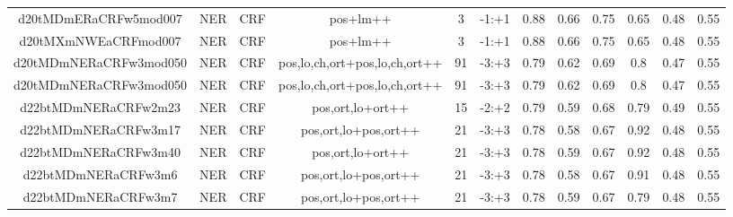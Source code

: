 \documentclass[a4paper]{article}
\begin{document}
\begin{landscape}
\begin{center}
\begin{tabular}{ |c|c|c|c|c|c|c|c|c|c|c|c|}
 
 	
 	\small{ d20tMDmERaCRFw5mod007 } & \small{ NER} & \small{  CRF }  & pos+lm++  &  3 &  \small{  -1:+1 }  &  0.88 & 0.66 & 0.75  &  0.65 & 0.48 & 0.55 \\
 	

 
 	
 	\small{ d20tMXmNWEaCRFmod007 } & \small{ NER} & \small{  CRF }  & pos+lm++  &  3 &  \small{  -1:+1 }  &  0.88 & 0.66 & 0.75  &  0.65 & 0.48 & 0.55 \\
 	

 
 	
 	\small{ d20tMDmNERaCRFw3mod050 } & \small{ NER} & \small{  CRF }  & pos,lo,ch,ort+pos,lo,ch,ort++  &  91 &  \small{  -3:+3 }  &  0.79 & 0.62 & 0.69  &  0.8 & 0.47 & 0.55 \\
 	

 
 	
 	\small{ d20tMDmNERaCRFw3mod050 } & \small{ NER} & \small{  CRF }  & pos,lo,ch,ort+pos,lo,ch,ort++  &  91 &  \small{  -3:+3 }  &  0.79 & 0.62 & 0.69  &  0.8 & 0.47 & 0.55 \\
 	

 
 	
 	\small{ d22btMDmNERaCRFw2m23 } & \small{ NER} & \small{  CRF }  & pos,ort,lo+ort++  &  15 &  \small{  -2:+2 }  &  0.79 & 0.59 & 0.68  &  0.79 & 0.49 & 0.55 \\
 	

 
 	
 	\small{ d22btMDmNERaCRFw3m17 } & \small{ NER} & \small{  CRF }  & pos,ort,lo+pos,ort++  &  21 &  \small{  -3:+3 }  &  0.78 & 0.58 & 0.67  &  0.92 & 0.48 & 0.55 \\
 	

 
 	
 	\small{ d22btMDmNERaCRFw3m40 } & \small{ NER} & \small{  CRF }  & pos,ort,lo+ort++  &  21 &  \small{  -3:+3 }  &  0.78 & 0.59 & 0.67  &  0.92 & 0.48 & 0.55 \\
 	

 
 	
 	\small{ d22btMDmNERaCRFw3m6 } & \small{ NER} & \small{  CRF }  & pos,ort,lo+pos,ort++  &  21 &  \small{  -3:+3 }  &  0.78 & 0.58 & 0.67  &  0.91 & 0.48 & 0.55 \\
 	

 
 	
 	\small{ d22btMDmNERaCRFw3m7 } & \small{ NER} & \small{  CRF }  & pos,ort,lo+pos,ort++  &  21 &  \small{  -3:+3 }  &  0.78 & 0.59 & 0.67  &  0.79 & 0.48 & 0.55 \\
 	


\end{tabular}
\end{center}
\end{landscape}
\end{document}
